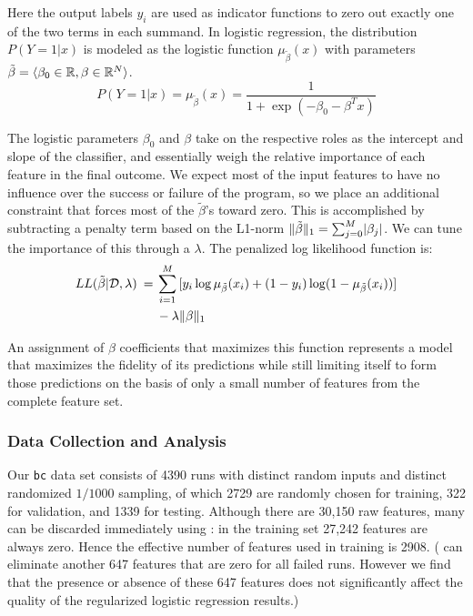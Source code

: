 Here the output labels $y_i$ are used as indicator functions to zero
out exactly one of the two terms in each summand.  In logistic
regression, the distribution $P(Y=1|x)$ is modeled as the logistic
function $\mu_{\tilde{\beta}}(x)$ with parameters $\tilde{\beta} = \langle \beta_0 \in
\mathbb{R}, \beta \in \mathbb{R}^N \rangle$.
\begin{equation*}
  P(Y = 1 | x) = \mu_{\tilde{\beta}} (x) = \frac{1}{1 + \exp(- \beta_0 - \beta^T x)}
\end{equation*}

The logistic parameters $\beta_0$ and $\beta$ take on the respective roles as
the intercept and slope of the classifier, and essentially weigh the
relative importance of each feature in the final outcome.  We expect
most of the input features to have no influence over the success or
failure of the program, so we place an additional constraint that
forces most of the $\tilde{\beta}$'s toward zero.  This is accomplished by
subtracting a penalty term based on the L1-norm $\lVert\tilde{\beta}\rVert_1 =
\sum_{j=0}^M \lvert\beta_j\rvert$.  We can tune the importance of this
 through a  $\lambda$.  The penalized log likelihood function is:
\begin{equation*}
  \begin{split}
    LL (\tilde{\beta} | \mathcal{D}, \lambda ) \:=\:
    & \sum_{i=1}^M \, [y_i \log \mu_{\tilde{\beta}} (x_i) + (1 - y_i) \log (1 - \mu_{\tilde{\beta}} (x_i))] \\
    & - \lambda \lVert\beta\rVert_1
  \end{split}
\end{equation*}

An assignment of $\beta$ coefficients that maximizes this function
represents a model that maximizes the fidelity of its predictions
while still limiting itself to form those predictions on the basis of
only a small number of features from the complete feature set.

\subsubsection{Data Collection and Analysis}

Our \texttt{bc} data set consists of 4390 runs with distinct random
inputs and distinct randomized $1/1000$ sampling, of which 2729 are
randomly chosen for training, 322 for validation, and 1339 for
testing.  Although there are 30,150 raw features, many can be
discarded immediately using :
in the training set 27,242 features are always zero.  Hence the
effective number of features used in training is 2908.
( can eliminate another
647 features that are zero for all failed runs.  However we find that
the presence or absence of these 647 features does not significantly
affect the quality of the regularized logistic regression results.)

